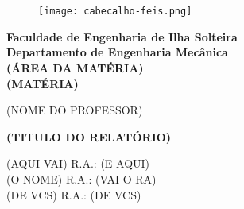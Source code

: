 \section*{}
    \thispagestyle{empty}       %
    \vspace{-1 cm}              %
	
	\begin{center} 
		\begin{figure} [h] \centering
		    \texttt{[image: cabecalho-feis.png]}
		\end{figure}

		{\large \textbf{Faculdade de Engenharia de Ilha Solteira}}\\    %
		\vspace{\parskip}
		{\large \textbf{Departamento de Engenharia Mecânica}}\\         %
		\vspace{\parskip}
		{\large \textbf{(ÁREA DA MATÉRIA)}}\\                   %
		\vspace{\parskip}
		{\large \textbf{(MATÉRIA)}}\\    %
        
        \vspace{3 cm}
        
        
		{\Large {(NOME DO PROFESSOR)}}\\ %
		
        \vspace{3.5 cm}


		{\LARGE \textbf{(TITULO DO RELATÓRIO)}} \\
		
		
        \vspace{3 cm}


		{\Large {(AQUI VAI)}} %
		{\large R.A.: (E AQUI)}\\ %
		{\Large {(O NOME)}} %
		{\large R.A.: (VAI O RA)}\\
		{\Large {(DE VCS)}} %
		{\large R.A.: (DE VCS)}\\ %


        \vspace{5 cm}

		\\
		\noindent {\large { \today} }\\ 
	\end{center}
	\newpage